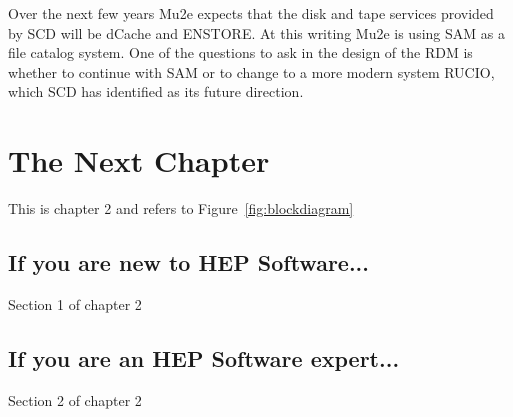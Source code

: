 Over the next few years Mu2e expects that the disk and tape services provided
by SCD will be dCache and ENSTORE.  At this writing Mu2e is using SAM as a file
catalog system.  One of the questions to ask in the design of the RDM is whether
to continue with SAM or to change to a more modern system RUCIO, which SCD
has identified as its future direction.

\chapter{The Next Chapter}
\label{ch:next_chapter}

This is chapter 2 and refers to Figure~\ref{fig:blockdiagram}



\section{If you are new to HEP Software...}

Section 1 of chapter 2


\section{If you are an HEP Software expert...}

Section 2 of chapter 2



